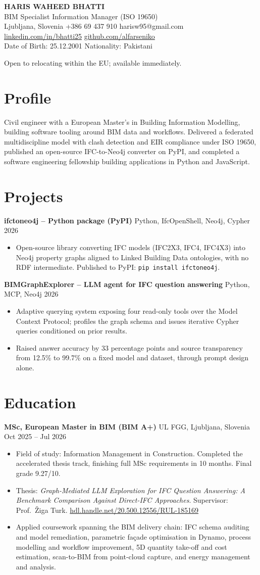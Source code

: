 \documentclass[a4paper,10.5pt]{article}
\newcommand{\datefill}{\dotfill}
\newcommand{\entry}[3]{\vspace{2.5pt}\noindent\textbf{#1} \textbar{} #2 \datefill{} #3\par\vspace{0.5pt}}
\newcommand{\ROLELINE}{BIM Specialist \textbar{} Information Manager (ISO 19650)}
\newcommand{\projIfcToNeo}{%
\entry{ifctoneo4j -- Python package (PyPI)}{Python, IfcOpenShell, Neo4j, Cypher}{2026}
\begin{itemize}
  \item Open-source library converting IFC models (IFC2X3, IFC4, IFC4X3) into Neo4j
        property graphs aligned to Linked Building Data ontologies, with no RDF
        intermediate. Published to PyPI: \texttt{pip install ifctoneo4j}.
\end{itemize}}
\newcommand{\projBIMGraph}{%
\entry{BIMGraphExplorer -- LLM agent for IFC question answering}{Python, MCP, Neo4j}{2026}
\begin{itemize}
  \item Adaptive querying system exposing four read-only tools over the Model
        Context Protocol; profiles the graph schema and issues iterative Cypher
        queries conditioned on prior results.
  \item Raised answer accuracy by 33 percentage points and source transparency from
        12.5\% to 99.7\% on a fixed model and dataset, through prompt design alone.
\end{itemize}}
\begin{document}
\begin{center}
  {\LARGE\bfseries HARIS WAHEED BHATTI}\\[2pt]
  {\large \ROLELINE}\\[3pt]
  Ljubljana, Slovenia \textbar{} +386 69 437 910 \textbar{} harisw95@gmail.com\\
  \href{https://linkedin.com/in/bhatti25}{linkedin.com/in/bhatti25} \textbar{}
  \href{https://github.com/alfarseniko}{github.com/alfarseniko}\\
  Date of Birth: 25.12.2001 \textbar{} Nationality: Pakistani
\end{center}
\vspace{-4pt}
\noindent\small Open to relocating within the EU; available immediately.\normalsize

\section{Profile}

\noindent Civil engineer with a European Master's in Building Information Modelling,
building software tooling around BIM data and workflows. Delivered a federated
multidiscipline model with clash detection and EIR compliance under ISO 19650,
published an open-source IFC-to-Neo4j converter on PyPI, and completed a software
engineering fellowship building applications in Python and JavaScript.

\section{Projects}

 \projIfcToNeo \projBIMGraph

\section{Education}
\entry{MSc, European Master in BIM (BIM A+)}{UL FGG, Ljubljana, Slovenia}{Oct 2025 -- Jul 2026}
\begin{itemize}
  \item Field of study: Information Management in Construction. Completed the
        accelerated thesis track, finishing full MSc requirements in 10 months.
        Final grade 9.27/10.
  \item Thesis: \textit{Graph-Mediated LLM Exploration for IFC Question Answering:
        A Benchmark Comparison Against Direct-IFC Approaches}. Supervisor:
        Prof.~\v{Z}iga Turk. \href{http://hdl.handle.net/20.500.12556/RUL-185169}{hdl.handle.net/20.500.12556/RUL-185169}
  \item Applied coursework spanning the BIM delivery chain: IFC schema auditing and model remediation, parametric façade optimisation in Dynamo, process modelling and workflow improvement, 5D quantity take-off and cost estimation, scan-to-BIM from point-cloud capture, and energy management and analysis.
\end{itemize}
\end{document}
